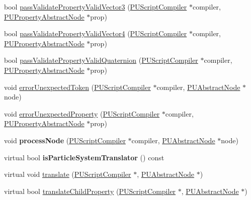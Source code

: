 \begin{DoxyCompactItemize}
\item 
bool \hyperlink{classPUScriptTranslator_a26d5b40eb43a7441b54bfd7534cff111}{pass\+Validate\+Property\+Valid\+Vector3} (\hyperlink{classPUScriptCompiler}{P\+U\+Script\+Compiler} $\ast$compiler, \hyperlink{classPUPropertyAbstractNode}{P\+U\+Property\+Abstract\+Node} $\ast$prop)
\item 
bool \hyperlink{classPUScriptTranslator_ab2c9eac05b8db1e39f208934a006518f}{pass\+Validate\+Property\+Valid\+Vector4} (\hyperlink{classPUScriptCompiler}{P\+U\+Script\+Compiler} $\ast$compiler, \hyperlink{classPUPropertyAbstractNode}{P\+U\+Property\+Abstract\+Node} $\ast$prop)
\item 
bool \hyperlink{classPUScriptTranslator_a94972ffef7d58c1537e3868d50c89dbf}{pass\+Validate\+Property\+Valid\+Quaternion} (\hyperlink{classPUScriptCompiler}{P\+U\+Script\+Compiler} $\ast$compiler, \hyperlink{classPUPropertyAbstractNode}{P\+U\+Property\+Abstract\+Node} $\ast$prop)
\item 
void \hyperlink{classPUScriptTranslator_ad17bf5fd56218fc667642122a100ba3e}{error\+Unexpected\+Token} (\hyperlink{classPUScriptCompiler}{P\+U\+Script\+Compiler} $\ast$compiler, \hyperlink{classPUAbstractNode}{P\+U\+Abstract\+Node} $\ast$node)
\item 
void \hyperlink{classPUScriptTranslator_a9752b9ee3231292a617cffe543515da9}{error\+Unexpected\+Property} (\hyperlink{classPUScriptCompiler}{P\+U\+Script\+Compiler} $\ast$compiler, \hyperlink{classPUPropertyAbstractNode}{P\+U\+Property\+Abstract\+Node} $\ast$prop)
\item 
\mbox{\label{classPUScriptTranslator_a22dee1a468d9cc1aaf6c1d69fcfc2caa}} 
void {\bfseries process\+Node} (\hyperlink{classPUScriptCompiler}{P\+U\+Script\+Compiler} $\ast$compiler, \hyperlink{classPUAbstractNode}{P\+U\+Abstract\+Node} $\ast$node)
\item 
\mbox{\label{classPUScriptTranslator_ac5bfa201e8de2286587a3c1748bec3c7}} 
virtual bool {\bfseries is\+Particle\+System\+Translator} () const
\item 
virtual void \hyperlink{classPUScriptTranslator_a28c7dd511a1057a136eb1b1703bce699}{translate} (\hyperlink{classPUScriptCompiler}{P\+U\+Script\+Compiler} $\ast$, \hyperlink{classPUAbstractNode}{P\+U\+Abstract\+Node} $\ast$)
\item 
virtual bool \hyperlink{classPUScriptTranslator_a034400413735bff32503c4bc24620286}{translate\+Child\+Property} (\hyperlink{classPUScriptCompiler}{P\+U\+Script\+Compiler} $\ast$, \hyperlink{classPUAbstractNode}{P\+U\+Abstract\+Node} $\ast$)

\end{DoxyCompactItemize}
